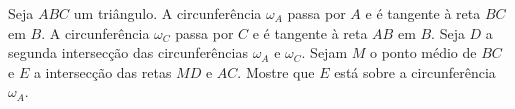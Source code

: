 Seja $ABC$ um triângulo. A circunferência $\omega_A$ passa por $A$ e é tangente à reta $BC$ em $B$. A circunferência $\omega_C$ passa por $C$ e é tangente à reta $AB$ em $B$. Seja $D$ a segunda intersecção das circunferências $\omega_A$ e $\omega_C$. Sejam $M$ o ponto médio de $BC$ e $E$ a intersecção das retas $MD$ e $AC$. Mostre que $E$ está sobre a circunferência $\omega_A$.
